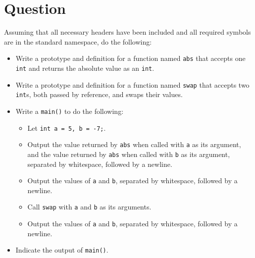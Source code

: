 \newpage

\section{Question}

Assuming that all necessary headers have been included and all required symbols
are in the standard namespace, do the following:

\begin{itemize}

  \item Write a prototype and definition for a function named
    \texttt{abs} that accepts one \texttt{int} and returns
    the absolute value as an \texttt{int}.
    \vfill

  \item Write a prototype and definition for a function named
    \texttt{swap} that accepts two \texttt{int}s, both passed
    by reference, and swaps their values.
    \vfill

  \item Write a \texttt{main()} to do the following:
    \begin{itemize}
      \item Let \texttt{int a = 5, b = -7;}.
      \item Output the value returned by \texttt{abs} when called with
        \texttt{a} as its argument, and the value returned by
        \texttt{abs} when called with \texttt{b} as its
        argument, separated by whitespace, followed by a newline.
      \item Output the values of \texttt{a} and \texttt{b},
        separated by whitespace, followed by a newline.
      \item Call \texttt{swap} with \texttt{a} and
        \texttt{b} as its arguments.
      \item Output the values of \texttt{a} and \texttt{b},
        separated by whitespace, followed by a newline.
    \end{itemize}
  \item Indicate the output of \texttt{main()}.
    \vfill

\end{itemize}

\newpage

